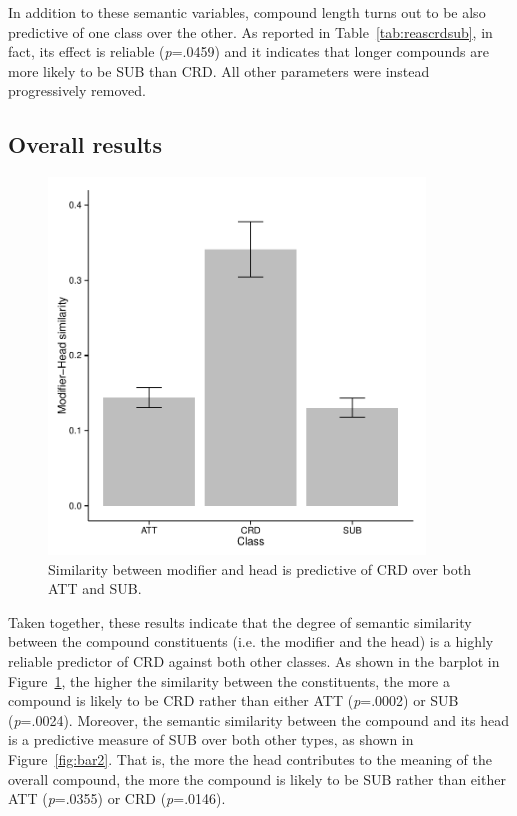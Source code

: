 \documentclass[output=paper]{langsci/langscibook}
\begin{document}
In addition to these semantic variables, compound length turns out to be also predictive of one class over the other. As reported in Table~\ref{tab:reascrdsub}, in fact, its effect is reliable (\emph{p}=.0459) and it indicates that longer compounds are more likely to be SUB than CRD. All other parameters were instead progressively removed.

\subsection{Overall results}

\begin{figure}[t!]
\begin{center}
\includegraphics[width=10cm]{figures/barplot1.pdf}
\caption{Similarity between modifier and head is predictive of CRD over both ATT and SUB.}\label{fig:bar1}
\end{center}
\end{figure}


Taken together, these results indicate that the degree of semantic similarity between the compound constituents (i.e. the modifier and the head) is a highly reliable predictor of CRD against both other classes. As shown in the barplot in Figure~\ref{fig:bar1}, the higher the similarity between the constituents, the more a compound is likely to be CRD rather than either ATT (\emph{p}=.0002) or SUB (\emph{p}=.0024). Moreover, the semantic similarity between the compound and its head is a predictive measure of SUB over both other types, as shown in Figure~\ref{fig:bar2}. That is, the more the head contributes to the meaning of the overall compound, the more the compound is likely to be SUB rather than either ATT (\emph{p}=.0355) or CRD (\emph{p}=.0146).
\end{document}
